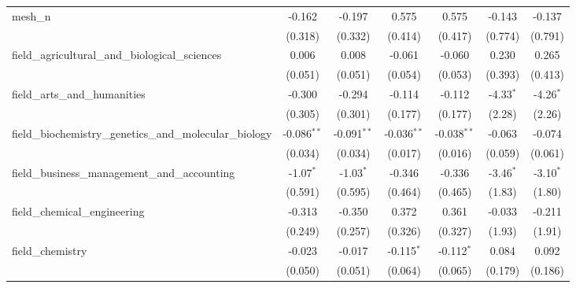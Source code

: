 \begin{tabular}{lcccccc}
   mesh\_n                                                     & -0.162        & -0.197         & 0.575         & 0.575          & -0.143        & -0.137\\   
                                                               & (0.318)       & (0.332)        & (0.414)       & (0.417)        & (0.774)       & (0.791)\\   
   field\_agricultural\_and\_biological\_sciences              & 0.006         & 0.008          & -0.061        & -0.060         & 0.230         & 0.265\\   
                                                               & (0.051)       & (0.051)        & (0.054)       & (0.053)        & (0.393)       & (0.413)\\   
   field\_arts\_and\_humanities                                & -0.300        & -0.294         & -0.114        & -0.112         & -4.33$^{*}$   & -4.26$^{*}$\\   
                                                               & (0.305)       & (0.301)        & (0.177)       & (0.177)        & (2.28)        & (2.26)\\   
   field\_biochemistry\_genetics\_and\_molecular\_biology      & -0.086$^{**}$ & -0.091$^{**}$  & -0.036$^{**}$ & -0.038$^{**}$  & -0.063        & -0.074\\   
                                                               & (0.034)       & (0.034)        & (0.017)       & (0.016)        & (0.059)       & (0.061)\\   
   field\_business\_management\_and\_accounting                & -1.07$^{*}$   & -1.03$^{*}$    & -0.346        & -0.336         & -3.46$^{*}$   & -3.10$^{*}$\\   
                                                               & (0.591)       & (0.595)        & (0.464)       & (0.465)        & (1.83)        & (1.80)\\   
   field\_chemical\_engineering                                & -0.313        & -0.350         & 0.372         & 0.361          & -0.033        & -0.211\\   
                                                               & (0.249)       & (0.257)        & (0.326)       & (0.327)        & (1.93)        & (1.91)\\   
   field\_chemistry                                            & -0.023        & -0.017         & -0.115$^{*}$  & -0.112$^{*}$   & 0.084         & 0.092\\   
                                                               & (0.050)       & (0.051)        & (0.064)       & (0.065)        & (0.179)       & (0.186)\\   

\end{tabular}
